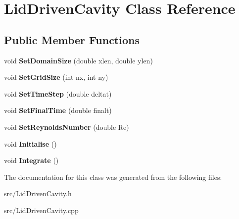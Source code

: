 \hypertarget{classLidDrivenCavity}{}\section{Lid\+Driven\+Cavity Class Reference}
\label{classLidDrivenCavity}
\subsection*{Public Member Functions}
\begin{DoxyCompactItemize}
\item 
\mbox{\label{classLidDrivenCavity_ac96a0dd4fe0d31f9daba2e126ff72885}} 
void {\bfseries Set\+Domain\+Size} (double xlen, double ylen)
\item 
\mbox{\label{classLidDrivenCavity_aa6f9fbebb9bf7cb481ff5f066e14f596}} 
void {\bfseries Set\+Grid\+Size} (int nx, int ny)
\item 
\mbox{\label{classLidDrivenCavity_a996ab414b064d520581b0d4ed08aa17d}} 
void {\bfseries Set\+Time\+Step} (double deltat)
\item 
\mbox{\label{classLidDrivenCavity_af9307f56a6f334e6740164c90775f461}} 
void {\bfseries Set\+Final\+Time} (double finalt)
\item 
\mbox{\label{classLidDrivenCavity_aeb6eca7e0c1255ebc4c1a8da56dd95b8}} 
void {\bfseries Set\+Reynolds\+Number} (double Re)
\item 
\mbox{\label{classLidDrivenCavity_ab0eb448219134e835173e94874a3983a}} 
void {\bfseries Initialise} ()
\item 
\mbox{\label{classLidDrivenCavity_a80cd7032d10f09279d62d03335023e72}} 
void {\bfseries Integrate} ()
\end{DoxyCompactItemize}


The documentation for this class was generated from the following files\+:\begin{DoxyCompactItemize}
\item 
src/Lid\+Driven\+Cavity.\+h\item 
src/Lid\+Driven\+Cavity.\+cpp\end{DoxyCompactItemize}

